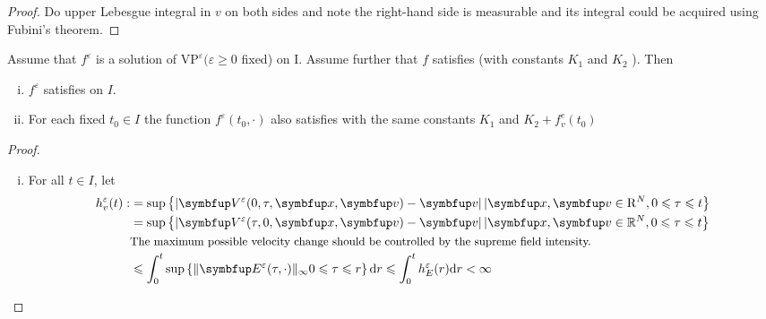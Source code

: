 \begin{lemma}
\begin{proof}
Do upper Lebesgue integral in $v$ on both sides and note the right-hand side is measurable and its integral could be acquired using Fubini's theorem. 

\end{proof}

\begin{lemma}
    Assume that $f^{\varepsilon}$ is a solution of $\text{VP}^{\varepsilon}(\varepsilon \geqslant 0$ fixed) on
I.
 Assume further that $f$ satisfies \supremumf (with constants $K_{1}$ and $K_{2}$ ). Then
 \begin{enumerate}[(i)]
     \item $f^{\varepsilon}$ satisfies \rhoabs on $I$.
     \item For each fixed $t_{0} \in I$ the function $f^{\varepsilon}\left(t_{0}, \cdot\right)$ also satisfies \supremumf with the same constants $K_{1}$ and $K_{2}+f_{v}^{e}\left(t_{0}\right)$
 \end{enumerate}
\end{lemma}

\begin{proof}
    \begin{enumerate}[(i)]
        \item  For all $t \in I$, let 
        \[
        \begin{array}{l}
        \begin{aligned}
        h_{v}^{\varepsilon}(t): &=\sup \left\{\left|\vect{V}^{\varepsilon}(0, \tau, \vx, \vv)-\vv\right| | \vx,\vv \in \mathrm{R}^{N}, 0 \leqslant \tau \leqslant t\right\} \\
        &=\sup \left\{\left|\vect{V}^{\varepsilon}(\tau, 0, \vx, \vv)-\vv\right| | \vx,\vv \in \mathbb{R}^{N}, 0 \leqslant \tau \leqslant t\right\} \\
        &\text{\small The maximum possible velocity change should be controlled by the supreme field intensity.}\\
        & \leqslant \int_{0}^{t} \sup \left\{\| \vE^{\varepsilon}(\tau, \cdot) \|_\infty 0 \leqslant \tau \leqslant r\right\} \mathrm{d} r \leqslant \int_{0}^{t} h_{E}^{\varepsilon}(r) \mathrm{d} r<\infty 
        \end{aligned}
        \end{array}
        \]
        

\end{enumerate}
\end{proof}
\end{lemma}
